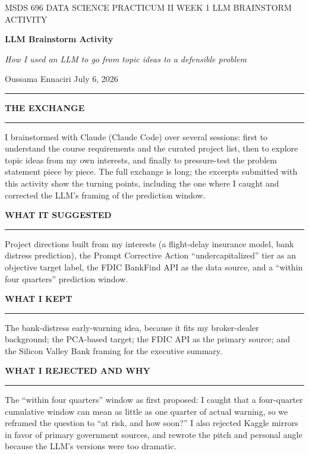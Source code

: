 \documentclass[11pt,letterpaper]{article}
\newcommand{\sectionhead}[1]{%
  \vspace{6pt}%
  {\sffamily\bfseries\fontsize{9.5}{12}\selectfont\color{navy}\MakeUppercase{#1}}\par
  \vspace{-9pt}\textcolor{hairline}{\rule{\textwidth}{0.5pt}}\par\vspace{0pt}}
\newcommand{\answer}[1]{#1\par\vspace{3pt}}
\begin{document}
\vspace*{-14pt}
{\sffamily\fontsize{8.5}{11}\selectfont\color{midgray}MSDS 696 DATA SCIENCE PRACTICUM II \quad\textbar\quad WEEK 1 LLM BRAINSTORM ACTIVITY}\par\vspace{10pt}
{\sffamily\bfseries\fontsize{21}{25}\selectfont\color{navy}LLM Brainstorm Activity}\par\vspace{6pt}
{\fontsize{12}{16}\selectfont\itshape\color{midgray}How I used an LLM to go from topic ideas to a defensible problem}\par\vspace{9pt}
{\sffamily\fontsize{9}{12}\selectfont Oussama Ennaciri \quad\textbar\quad July 6, 2026}\par\vspace{5pt}
\textcolor{navy}{\rule{\textwidth}{1.2pt}}

\sectionhead{The exchange}
\answer{I brainstormed with Claude (Claude Code) over several sessions: first to understand the course requirements and the curated project list, then to explore topic ideas from my own interests, and finally to pressure-test the problem statement piece by piece. The full exchange is long; the excerpts submitted with this activity show the turning points, including the one where I caught and corrected the LLM's framing of the prediction window.}

\sectionhead{What it suggested}
\answer{Project directions built from my interests (a flight-delay insurance model, bank distress prediction), the Prompt Corrective Action ``undercapitalized'' tier as an objective target label, the FDIC BankFind API as the data source, and a ``within four quarters'' prediction window.}

\sectionhead{What I kept}
\answer{The bank-distress early-warning idea, because it fits my broker-dealer background; the PCA-based target; the FDIC API as the primary source; and the Silicon Valley Bank framing for the executive summary.}

\sectionhead{What I rejected and why}
\answer{The ``within four quarters'' window as first proposed: I caught that a four-quarter cumulative window can mean as little as one quarter of actual warning, so we reframed the question to ``at risk, and how soon?'' I also rejected Kaggle mirrors in favor of primary government sources, and rewrote the pitch and personal angle because the LLM's versions were too dramatic.}
\end{document}
